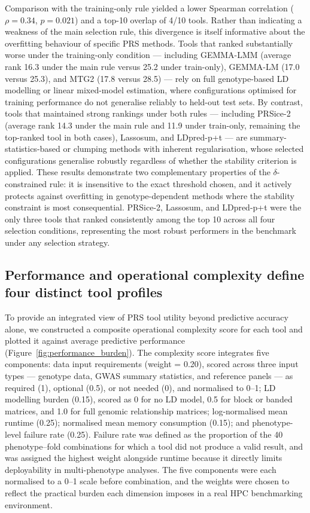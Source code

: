 \documentclass[pdflatex,sn-basic]{sn-jnl}
\begin{document}
Comparison with the training-only rule yielded a lower Spearman correlation ($\rho = 0.34$, $p = 0.021$) and a top-10 overlap of 4/10 tools. Rather than indicating a weakness of the main selection rule, this divergence is itself informative about the overfitting behaviour of specific PRS methods. Tools that ranked substantially worse under the training-only condition --- including GEMMA-LMM (average rank 16.3 under the main rule versus 25.2 under train-only), GEMMA-LM (17.0 versus 25.3), and MTG2 (17.8 versus 28.5) --- rely on full genotype-based LD modelling or linear mixed-model estimation, where configurations optimised for training performance do not generalise reliably to held-out test sets. By contrast, tools that maintained strong rankings under both rules --- including PRSice-2 (average rank 14.3 under the main rule and 11.9 under train-only, remaining the top-ranked tool in both cases), Lassosum, and LDpred-p+t --- are summary-statistics-based or clumping methods with inherent regularisation, whose selected configurations generalise robustly regardless of whether the stability criterion is applied. These results demonstrate two complementary properties of the $\delta$-constrained rule: it is insensitive to the exact threshold chosen, and it actively protects against overfitting in genotype-dependent methods where the stability constraint is most consequential. PRSice-2, Lassosum, and LDpred-p+t were the only three tools that ranked consistently among the top 10 across all four selection conditions, representing the most robust performers in the benchmark under any selection strategy.



\subsection*{Performance and operational complexity define four distinct tool profiles} 

To provide an integrated view of PRS tool utility beyond predictive accuracy alone, we constructed a composite operational complexity score for each tool and plotted it against average predictive performance (Figure~\ref{fig:performance_burden}). The complexity score integrates five components: data input requirements (weight = 0.20), scored across three input types --- genotype data, GWAS summary statistics, and reference panels --- as required (1), optional (0.5), or not needed (0), and normalised to 0--1; LD modelling burden (0.15), scored as 0 for no LD model, 0.5 for block or banded matrices, and 1.0 for full genomic relationship matrices; log-normalised mean runtime (0.25); normalised mean memory consumption (0.15); and phenotype-level failure rate (0.25). Failure rate was defined as the proportion of the 40 phenotype--fold combinations for which a tool did not produce a valid result, and was assigned the highest weight alongside runtime because it directly limits deployability in multi-phenotype analyses. The five components were each normalised to a 0--1 scale before combination, and the weights were chosen to reflect the practical burden each dimension imposes in a real HPC benchmarking environment. 
\end{document}
